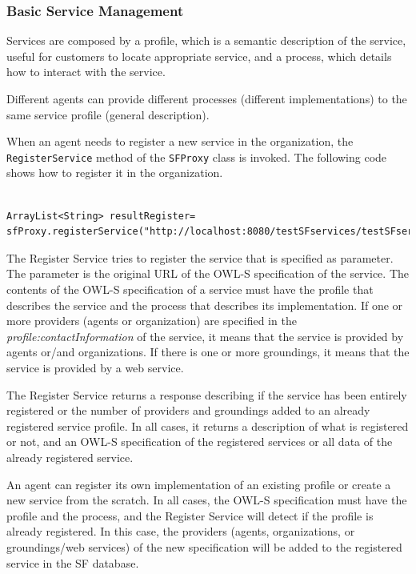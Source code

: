 \subsubsection{Basic Service Management}
Services are composed by a profile, which is a semantic description of the  service, useful for customers to locate appropriate service, and a process, which details how to interact with the service. 

Different agents can provide different processes (different implementations) to the same service profile (general description).

When an agent needs to register a new service in the organization, the \lstinline|RegisterService| method of the \lstinline|SFProxy| class is invoked. The following code shows how to register it in the organization.

\begin{lstlisting}

ArrayList<String> resultRegister= sfProxy.registerService("http://localhost:8080/testSFservices/testSFservices/owl/owls/Addition.owl");

\end{lstlisting}

\vspace{1cm}

The Register Service tries to register the service that is specified as parameter. The parameter is the original URL of the OWL-S specification of the service. The contents of the OWL-S specification of a service must have the profile that describes the service and the process that describes its implementation. If one or more providers (agents or organization) are specified in the \textit{profile:contactInformation} of the service, it means that the service is provided by agents or/and organizations. If there is one or more groundings, it means that the service is provided by a web service.  


The Register Service returns a response describing if the service has been entirely registered or the number of providers and groundings added to an already registered service profile. In all cases, it returns a description of what is registered or not, and an OWL-S specification of the registered services or all data of the already registered service.



An agent can register its own implementation of an existing profile or create a new service from the scratch. In all cases, the OWL-S specification must have the profile and the process, and the Register Service will detect if the profile is already registered. In this case, the providers (agents, organizations, or groundings/web services) of the new specification will be added to the registered service in the SF database.


